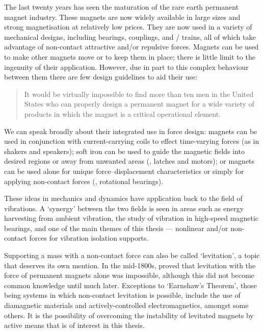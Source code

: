 \documentclass[11pt,a4paper]{memoir}
\begin{document}
The last twenty years has seen the maturation of the rare earth permanent magnet industry.
These magnets are now widely available in large sizes and strong magnetisation at relatively low prices.
They are now used in a variety of mechanical designs, including bearings, couplings, and \maglev/ trains, all of which take advantage of non-contact attractive and/or repulsive forces.
Magnets can be used to make other magnets move or to keep them in place; there is little limit to the ingenuity of their application.
However, due in part to this complex behaviour between them there are few design guidelines to aid their use:
\begin{quote}
It would be virtually impossible to find more than ten men in the United States who can properly design a permanent magnet for a wide variety of products in which the magnet is a critical operational element. \cite{moskowitz1995}
\end{quote}
We can speak broadly about their integrated use in force design: magnets can be used in conjunction with current-carrying coils to effect time-varying forces (as in shakers and speakers); soft iron can be used to guide the magnetic fields into desired regions or away from unwanted areas (\eg, latches and motors); or magnets can be used alone for unique force--displacement characteristics or simply for applying non-contact forces (\eg, rotational bearings).

These ideas in mechanics and dynamics have application back to the field of vibrations.
A `synergy' between the two fields is seen in areas such as energy harvesting from ambient vibration, the study of vibration in high-speed magnetic bearings, and one of the main themes of this thesis — nonlinear and/or non-contact forces for vibration isolation supports.

Supporting a mass with a non-contact force can also be called `levitation', a topic that deserves its own mention.
In the mid-1800s, \textcite{earnshaw1842} proved that levitation with the force of permanent magnets alone was impossible, although this did not become common knowledge  until much later.
Exceptions to `Earnshaw's Theorem', those being systems in which non-contact levitation is possible, include the use of diamagnetic materials and actively-controlled electromagnetics, amongst some others.
It is the possibility of overcoming the instability of levitated magnets by active means that is of interest in this thesis.
\end{document}
